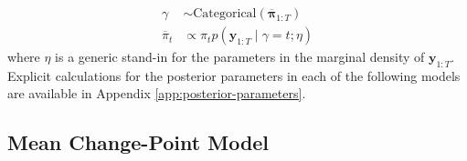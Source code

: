 \begin{align}
    \gamma &\sim \text{Categorical}(\overline{\boldsymbol{\pi}}_{1:T}) \label{eq:gamma-post-cat1} \\ 
    \overline{\pi}_t &\propto  \pi_t p(\mathbf{y}_{1:T} \;|\; \gamma = t ; \eta) \label{eq:gamma-post-cat2}
\end{align}
where $\eta$ is a generic stand-in for the parameters in the marginal density of $\mathbf{y}_{1:T}$. Explicit calculations for the posterior parameters in each of the following models are available in Appendix \ref{app:posterior-parameters}.

\subsection{Mean Change-Point Model}
\label{sec:smcp}


